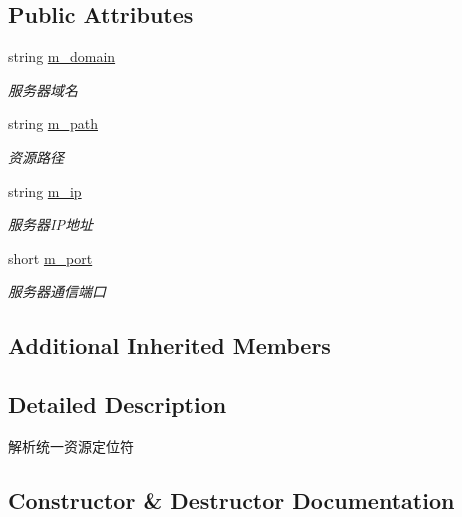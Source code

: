 \subsection*{Public Attributes}
\begin{DoxyCompactItemize}
\item 
\mbox{\label{class_dns_url_ad9f701802bbd22f6d6be49dc79a00eb5}} 
string \hyperlink{class_dns_url_ad9f701802bbd22f6d6be49dc79a00eb5}{m\+\_\+domain}
\begin{DoxyCompactList}\small\item\em 服务器域名 \end{DoxyCompactList}\item 
\mbox{\label{class_dns_url_ae7833d53958fbaab4de95d4406c5943d}} 
string \hyperlink{class_dns_url_ae7833d53958fbaab4de95d4406c5943d}{m\+\_\+path}
\begin{DoxyCompactList}\small\item\em 资源路径 \end{DoxyCompactList}\item 
\mbox{\label{class_dns_url_a10a0576c9e2fb2a9179f27e10a3dc3ef}} 
string \hyperlink{class_dns_url_a10a0576c9e2fb2a9179f27e10a3dc3ef}{m\+\_\+ip}
\begin{DoxyCompactList}\small\item\em 服务器\+I\+P地址 \end{DoxyCompactList}\item 
\mbox{\label{class_dns_url_a471067dc236c12e337f7b25e771f2f74}} 
short \hyperlink{class_dns_url_a471067dc236c12e337f7b25e771f2f74}{m\+\_\+port}
\begin{DoxyCompactList}\small\item\em 服务器通信端口 \end{DoxyCompactList}\end{DoxyCompactItemize}
\subsection*{Additional Inherited Members}


\subsection{Detailed Description}
解析统一资源定位符 

\subsection{Constructor \& Destructor Documentation}
\mbox{\label{class_dns_url_a755c96cfb2eb70b9a39585553424f435}} 

